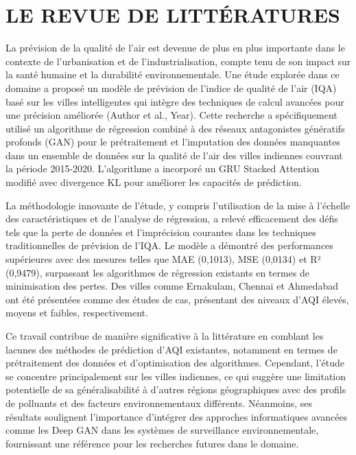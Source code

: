 \documentclass[12pt,a4paper]{report}
\begin{document}
\chapter{LE REVUE DE LITTÉRATURES}
La prévision de la qualité de l'air est devenue de plus en plus importante dans le contexte de l'urbanisation et de l'industrialisation, compte tenu de son impact sur la santé humaine et la durabilité environnementale. Une étude explorée dans ce domaine a proposé un modèle de prévision de l'indice de qualité de l'air (IQA) basé sur les villes intelligentes qui intègre des techniques de calcul avancées pour une précision améliorée (Author et al., Year). Cette recherche a spécifiquement utilisé un algorithme de régression combiné à des réseaux antagonistes génératifs profonds (GAN) pour le prétraitement et l'imputation des données manquantes dans un ensemble de données sur la qualité de l'air des villes indiennes couvrant la période 2015-2020. L'algorithme a incorporé un GRU Stacked Attention modifié avec divergence KL pour améliorer les capacités de prédiction.

La méthodologie innovante de l'étude, y compris l'utilisation de la mise à l'échelle des caractéristiques et de l'analyse de régression, a relevé efficacement des défis tels que la perte de données et l'imprécision courantes dans les techniques traditionnelles de prévision de l'IQA. Le modèle a démontré des performances supérieures avec des mesures telles que MAE (0,1013), MSE (0,0134) et R² (0,9479), surpassant les algorithmes de régression existants en termes de minimisation des pertes. Des villes comme Ernakulam, Chennai et Ahmedabad ont été présentées comme des études de cas, présentant des niveaux d'AQI élevés, moyens et faibles, respectivement.

Ce travail contribue de manière significative à la littérature en comblant les lacunes des méthodes de prédiction d'AQI existantes, notamment en termes de prétraitement des données et d'optimisation des algorithmes. Cependant, l'étude se concentre principalement sur les villes indiennes, ce qui suggère une limitation potentielle de sa généralisabilité à d'autres régions géographiques avec des profils de polluants et des facteurs environnementaux différents. Néanmoins, ses résultats soulignent l'importance d'intégrer des approches informatiques avancées comme les Deep GAN dans les systèmes de surveillance environnementale, fournissant une référence pour les recherches futures dans le domaine.
\end{document}
